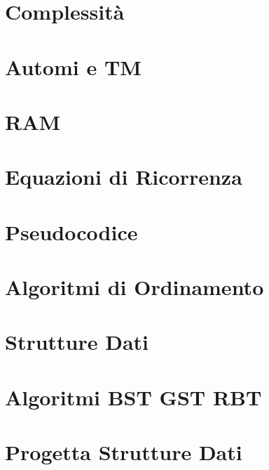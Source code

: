 



\begin{titlepage}
    \maketitle
    \thispagestyle{empty}  %
\end{titlepage}

\section{Complessità}

\newpage

\section{Automi e TM}

\newpage

\section{RAM}

\newpage

\section{Equazioni di Ricorrenza}

\newpage

\section{Pseudocodice}

\newpage

\section{Algoritmi di Ordinamento}

\newpage

\section{Strutture Dati}

\newpage

\section{Algoritmi BST GST RBT}

\newpage

\section{Progetta Strutture Dati}


